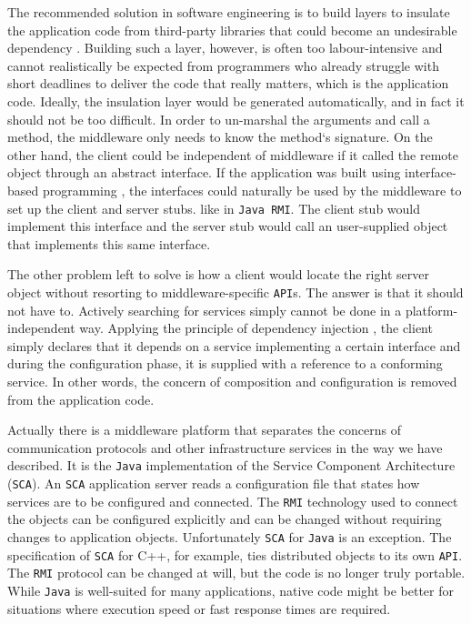 The recommended solution in software engineering is to build layers to insulate
the application code from third-party libraries that could become an undesirable dependency \cite{Sommerville}.
Building such a layer, however, is often too labour-intensive and cannot realistically be expected from programmers
who already struggle with short deadlines to deliver the code that really matters, which is the application code.
Ideally, the insulation layer would be generated automatically, and in fact it should not be too difficult. In order
to un-marshal the arguments and call a method, the middleware only needs to know the method`s signature. On the
other hand, the client could be independent of middleware if it called the remote object through an abstract
interface. If the application was built using interface-based programming \cite{Pugh}, the interfaces could naturally
be used by the middleware to set up the client and server stubs. like in \texttt{\texttt{Java} \texttt{RMI}}. The client stub would
implement this interface and the server stub would call an user-supplied object that implements this same interface.

The other problem left to solve is how a client would locate the right server object without resorting to middleware-specific \texttt{API}s.
The answer is that it should not have to. Actively searching for services simply cannot be done in a platform-independent way.
Applying the principle of dependency injection \cite{Fowler2}, the client simply declares that it depends on a service implementing
a certain interface and during the configuration phase, it is supplied with a reference to a conforming service. In other words,
the concern of composition and configuration is removed from the application code.

Actually there is a middleware platform that separates the concerns of communication protocols and other infrastructure services
in the way we have described. It is the \texttt{Java} implementation of the Service Component
Architecture (\texttt{SCA}). An \texttt{SCA} application server reads a configuration file that states how services are to be configured
and connected. The \texttt{RMI} technology used to connect the objects can be configured explicitly and can be changed without requiring
changes to application objects. Unfortunately \texttt{SCA} for \texttt{Java} is an exception. The specification of \texttt{SCA} for C++, for example,
ties distributed objects to its own \texttt{API}. The \texttt{RMI} protocol can be changed at will, but the code is no longer truly portable.
While \texttt{Java} is well-suited for many applications, native code might be better for situations where execution speed or fast response
times are required.

